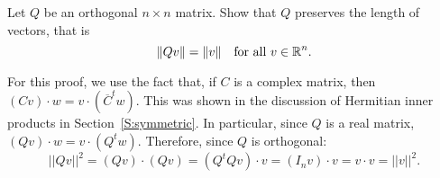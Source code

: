 \documentclass{ximera}
\begin{document}
\begin{exercise} \label{c7.9.2}
Let $Q$ be an orthogonal $n\times n$ matrix.
Show that $Q$ preserves the length of vectors, that is
\[
\|Qv\| = \|v\|\quad \mbox{for all $v\in\mbox{$\Bbb{R}$}^n$.}
\]

\begin{solution}

For this proof, we use the fact that, if $C$ is a complex matrix, then
$(Cv) \cdot w = v \cdot (\overline{C}^tw)$.  This was shown in the discussion
of Hermitian inner products in Section~\ref{S:symmetric}.  In particular,
since $Q$ is a real matrix, $(Qv) \cdot w = v \cdot (Q^tw)$.  Therefore,
since $Q$ is orthogonal:
\[
||Qv||^2 = (Qv) \cdot (Qv) = (Q^tQv) \cdot v = (I_nv) \cdot v
= v \cdot v = ||v||^2.
\]


\end{solution}
\end{exercise}
\end{document}
